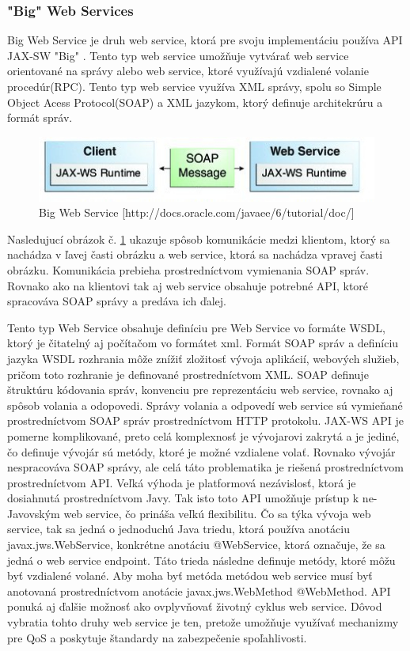 \subsubsection{"Big" Web Services}
Big Web Service je druh web service, ktorá pre svoju implementáciu používa API JAX-SW\cite{fitWeb} "Big" . Tento typ web service umožňuje vytvárať web service orientované na správy alebo web service, ktoré využívajú vzdialené volanie procedúr(RPC). Tento typ web service využíva XML správy, spolu so Simple Object Acess Protocol(SOAP) a XML jazykom, ktorý definuje architekrúru a formát správ.
\begin{figure}[htb]

\begin{center}

\includegraphics[scale=0.5]{webservice.jpg} 
\caption{Big Web Service [http://docs.oracle.com/javaee/6/tutorial/doc/] }
\label{com}

\end{center}

\end{figure}
Nasledujucí obrázok č. \ref{com} ukazuje spôsob komunikácie medzi klientom, ktorý sa nachádza v ľavej časti obrázku a web service, ktorá sa nachádza vpravej časti obrázku. Komunikácia prebieha prostredníctvom vymienania SOAP správ. Rovnako ako na klientovi tak aj web service obsahuje potrebné API, ktoré spracováva SOAP správy a predáva ich ďalej.


 Tento typ Web Service obsahuje definíciu pre Web Service vo formáte WSDL, ktorý je čitatelný aj počítačom vo formátet xml. Formát SOAP správ a definíciu jazyka WSDL rozhrania môže znížiť zložitosť vývoja aplikácií, webových služieb, pričom toto rozhranie je definované prostredníctvom XML. SOAP definuje štruktúru kódovania správ, konvenciu pre reprezentáciu web service, rovnako aj spôsob volania a odopovedi. Správy volania a odpovedí web service sú vymieňané prostredníctvom SOAP správ prostredníctvom HTTP protokolu. JAX-WS API je pomerne komplikované, preto celá komplexnosť je vývojarovi zakrytá a je jediné, čo definuje vývojár sú metódy, ktoré je možné vzdialene volať. Rovnako vývojár nespracováva SOAP správy, ale celá táto problematika je riešená prostredníctvom prostredníctvom API. Veľká výhoda je platformová nezávislosť, ktorá je dosiahnutá prostredníctvom Javy. Tak isto toto API umožňuje prístup k ne-Javovským web service, čo prináša veľkú flexibilitu. Čo sa týka vývoja web service, tak sa jedná o jednoduchú Java triedu, ktorá používa anotáciu javax.jws.WebService, konkrétne anotáciu @WebService, ktorá označuje, že sa jedná o web service endpoint. Táto trieda následne definuje metódy, ktoré môžu byť vzdialené volané. Aby moha byť metóda metódou web service musí byť anotovaná prostredníctvom anotácie  javax.jws.WebMethod @WebMethod. API ponuká aj ďalšie možnosť ako ovplyvňovať životný cyklus web service. Dôvod vybratia tohto druhy web service je ten, pretože umožňuje využívať mechanizmy pre QoS a poskytuje štandardy na zabezpečenie spoľahlivosti.


